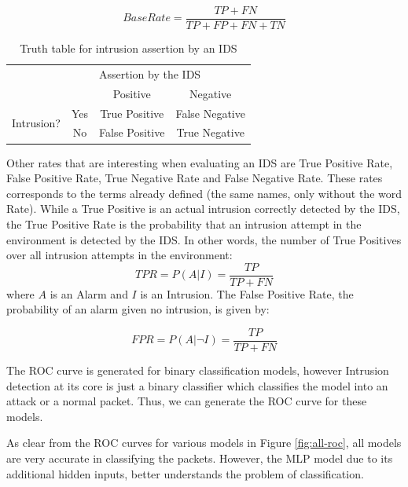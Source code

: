 \documentclass[12pt]{article}
\theoremstyle{definition}
\begin{document}
		\begin{equation}
			\label{base-rate-eqn}
			Base Rate = \frac{TP + FN}{TP + FP + FN + TN}
		\end{equation}
		
		\begin{table}[]
			\centering
			\caption{Truth table for intrusion assertion by an IDS}
			\label{table:ids-tt}
			\begin{tabular}{|c|c|c|c|}
				\hline
				\multicolumn{2}{|c|}{\multirow{2}{*}{\textbf{}}} & \multicolumn{2}{l|}{Assertion by the IDS} \\ \cline{3-4} 
				\multicolumn{2}{|c|}{}                           & Positive            & Negative            \\ \hline
				\multirow{2}{*}{Intrusion?}         & Yes        & True Positive       & False Negative      \\ \cline{2-4} 
				& No         & False Positive      & True Negative       \\ \hline
			\end{tabular}
		\end{table}
	
		
	
		Other rates that are interesting when evaluating an IDS are True Positive Rate, False Positive Rate, True Negative Rate and False Negative Rate. These rates corresponds to the terms already defined (the same names, only without the word Rate). While a True Positive is an actual intrusion correctly detected by the IDS, the True Positive Rate is the probability that an intrusion attempt in the environment is detected by the IDS. In other words, the number of True Positives over all intrusion attempts in the environment:
		\begin{equation}
		TPR = P(A | I) = \frac{TP}{TP + FN}
		\end{equation}
		where $ A $ is an Alarm and $ I $ is an Intrusion. The False Positive Rate, the probability of an alarm given no intrusion, is given by:
		
		\begin{equation}
			FPR = P(A | \neg I) = \frac{TP}{TP + FN}
		\end{equation}
		
		The ROC curve is generated for binary classification models, however Intrusion detection at its core is just a binary classifier which classifies the model into an attack or a normal packet. Thus, we can generate the ROC curve for these models.
		
		As clear from the ROC curves for various models in Figure \ref{fig:all-roc}, all models are very accurate in classifying the packets. However, the MLP model due to its additional hidden inputs, better understands the problem of classification.
		
\end{document}
